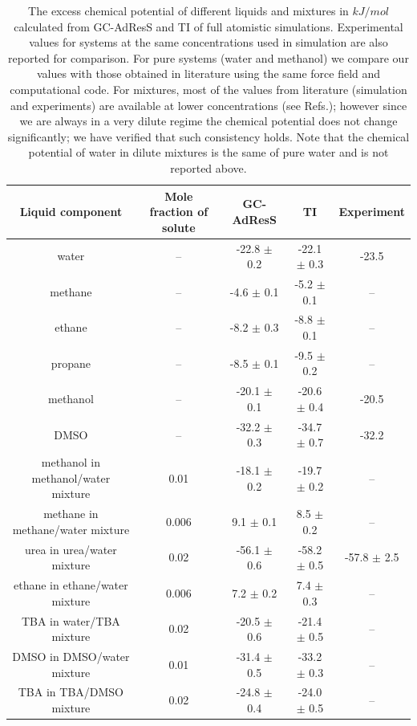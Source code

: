 \documentclass[a4paper,preprint,unsortedaddress]{revtex4-1}
\begin{document}
\begin{table}[htpb]
\begin{center}
\begin{tabular}{ccccc}
\hline \hline
 Liquid component & Mole fraction of solute & GC-AdResS & TI & Experiment \\
\hline
water    & -- & -22.8 $\pm$ 0.2  & -22.1 $\pm$ 0.3 & -23.5 \cite{florian} \\
methane  & -- & -4.6 $\pm$ 0.1  & -5.2 $\pm$ 0.1 & -- \\
ethane   & -- & -8.2 $\pm$ 0.3  &  -8.8 $\pm$ 0.1 & -- \\
propane  & -- & -8.5 $\pm$ 0.1 & -9.5 $\pm$ 0.2 & -- \\
methanol  & -- & -20.1 $\pm$ 0.1 & -20.6 $\pm$ 0.4 & -20.5 \cite{vang}  \\
DMSO & -- & -32.2 $\pm$ 0.3 & -34.7 $\pm$ 0.7 & -32.2 \cite{dmso}  \\
methanol in methanol/water mixture & 0.01 & -18.1 $\pm$ 0.2 & -19.7 $\pm$ 0.2 & -- \\
methane in methane/water mixture & 0.006 & 9.1 $\pm$ 0.1  & 8.5 $\pm$ 0.2 & -- \\
urea in urea/water mixture & 0.02 & -56.1 $\pm$ 0.6 & -58.2 $\pm$ 0.5 & -57.8 $\pm$ 2.5 \cite{urea} \\
ethane in ethane/water mixture & 0.006 & 7.2 $\pm$ 0.2 & 7.4 $\pm$ 0.3 & -- \\ 
TBA in water/TBA mixture & 0.02 & -20.5 $\pm$ 0.6 & -21.4 $\pm$ 0.5 & -- \\
DMSO in DMSO/water mixture & 0.01 & -31.4 $\pm$ 0.5 & -33.2 $\pm$ 0.3 & -- \\
TBA in TBA/DMSO mixture & 0.02 & -24.8 $\pm$ 0.4 & -24.0 $\pm$ 0.5 & -- \\
\hline \hline
\end{tabular}
\caption{The excess chemical potential of different liquids and mixtures in $kJ/mol$ calculated from GC-AdResS and TI of full atomistic simulations. Experimental values for systems at the same concentrations used in simulation are also reported for comparison. For pure systems (water and methanol) we compare our values with those obtained in literature using the same force field and computational code. For mixtures, most of the values from literature (simulation and experiments) are available at lower concentrations (see Refs.\cite{vang,nico}); however since we are always in a very dilute regime the chemical potential does not change significantly; we have verified that such consistency holds. Note that the chemical potential of water in dilute mixtures is the same of pure water and is not reported above.
}
\label{table}
\end{center}
\end{table}
\end{document}
